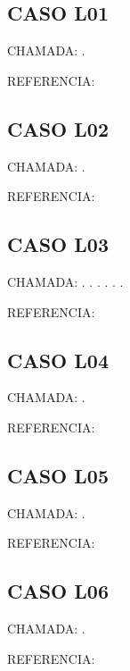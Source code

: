 \documentclass{undftex}
\begin{document}
\begin{refsection}\section*{CASO L01} CHAMADA: . \textcite{v01}\par REFERENCIA:\par\printbibliography[heading=none,check=undfconsultadas]\end{refsection}\clearpage
\begin{refsection}\section*{CASO L02} CHAMADA: . \textcite{l02}\par REFERENCIA:\par\printbibliography[heading=none,check=undfconsultadas]\end{refsection}\clearpage
\begin{refsection}\section*{CASO L03} CHAMADA: . \textcite{l28}. \textcite{l03}. \textcite{l27}. \textcite{lcontrib}. \textcite{l29}. \textcite{l03}\par REFERENCIA:\par\printbibliography[heading=none,check=undfconsultadas]\end{refsection}\clearpage
\begin{refsection}\section*{CASO L04} CHAMADA: . \textcite{l04}\par REFERENCIA:\par\printbibliography[heading=none,check=undfconsultadas]\end{refsection}\clearpage
\begin{refsection}\section*{CASO L05} CHAMADA: . \textcite{l05}\par REFERENCIA:\par\printbibliography[heading=none,check=undfconsultadas]\end{refsection}\clearpage
\begin{refsection}\section*{CASO L06} CHAMADA: . \textcite{l06}\par REFERENCIA:\par\printbibliography[heading=none,check=undfconsultadas]\end{refsection}\clearpage
\end{document}
